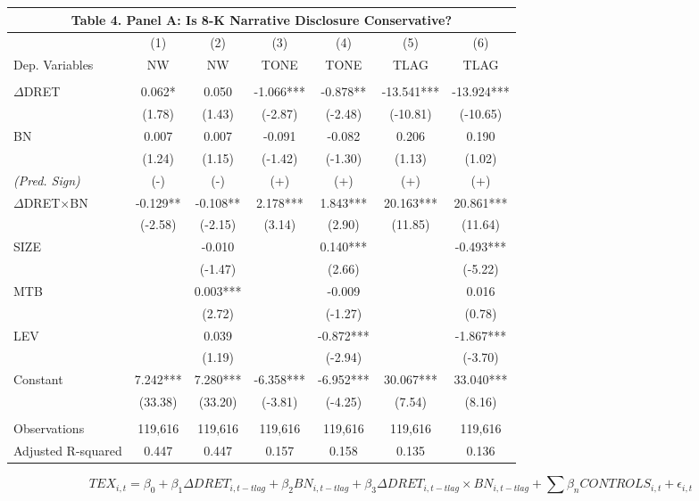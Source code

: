 \begin{table}[H] \label{T4PA}%
	\begin{center}
		\begin{tabular}{lcccccc}
			\multicolumn{7}{c}{\textbf{Table 4. Panel A: Is 8-K Narrative Disclosure Conservative?}} \\
			\midrule
			\midrule
			& (1) & (2) & (3) & (4) & (5) & (6) \\
			Dep. Variables & NW & NW & TONE & TONE & TLAG & TLAG \\
			\midrule
			&   &   &   &   &   &  \\
			$\Delta$DRET & 0.062* & 0.050 & -1.066*** & -0.878** & -13.541*** & -13.924*** \\
			& (1.78) & (1.43) & (-2.87) & (-2.48) & (-10.81) & (-10.65) \\
			BN & 0.007 & 0.007 & -0.091 & -0.082 & 0.206 & 0.190 \\
			& (1.24) & (1.15) & (-1.42) & (-1.30) & (1.13) & (1.02) \\
			\rowcolor[rgb]{ .933,  .925,  .882} \textit{(Pred. Sign)} & (-) & (-) & (+) & (+) & (+) & (+) \\
			\rowcolor[rgb]{ .933,  .925,  .882} $\Delta$DRET$\times$BN & -0.129** & -0.108** & 2.178*** & 1.843*** & 20.163*** & 20.861*** \\
			\rowcolor[rgb]{ .933,  .925,  .882}   & (-2.58) & (-2.15) & (3.14) & (2.90) & (11.85) & (11.64) \\
			SIZE &   & -0.010 &   & 0.140*** &   & -0.493*** \\
			&   & (-1.47) &   & (2.66) &   & (-5.22) \\
			MTB &   & 0.003*** &   & -0.009 &   & 0.016 \\
			&   & (2.72) &   & (-1.27) &   & (0.78) \\
			LEV &   & 0.039 &   & -0.872*** &   & -1.867*** \\
			&   & (1.19) &   & (-2.94) &   & (-3.70) \\
			Constant & 7.242*** & 7.280*** & -6.358*** & -6.952*** & 30.067*** & 33.040*** \\
			& (33.38) & (33.20) & (-3.81) & (-4.25) & (7.54) & (8.16) \\
			&   &   &   &   &   &  \\
			Observations & 119,616 & 119,616 & 119,616 & 119,616 & 119,616 & 119,616 \\
			Adjusted R-squared & 0.447 & 0.447 & 0.157 & 0.158 & 0.135 & 0.136 \\
			\bottomrule
			\bottomrule
		\end{tabular}%
	\end{center}
		\begin{footnotesize}
			\setcounter{equation}{1}
			\begin{equation}
				TEX_{i,t}=\beta_0+\beta_1\Delta DRET_{i,t-tlag}+\beta_2BN_{i,t-tlag}+\beta_3\Delta DRET_{i,t-tlag}\times 	BN_{i,t-tlag}+\sum\beta_nCONTROLS_{i,t}+\epsilon_{i,t}
			\end{equation}
			

\end{footnotesize}
\end{table}
